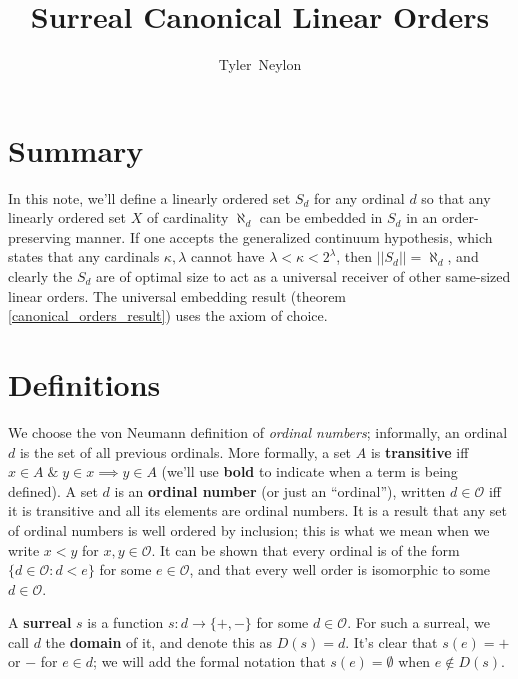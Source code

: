 \documentclass[11pt]{amsart}
\title{Surreal Canonical Linear Orders}
\author{Tyler~Neylon}
\begin{document}
\maketitle

\section{Summary}

In this note, we'll define a linearly ordered set $S_d$ for any ordinal $d$ so that
any linearly ordered set $X$ of cardinality $\aleph_d$ can be embedded in $S_d$
in an order-preserving manner.  If one accepts the generalized continuum hypothesis, which
states that any cardinals $\kappa, \lambda$ cannot have $\lambda < \kappa < 2^\lambda$, then
$||S_d|| = \aleph_d$, and clearly the $S_d$ are of optimal size to act as a universal receiver of
other same-sized linear orders.  The universal embedding result (theorem \ref{canonical_orders_result})
uses the axiom of choice.

\section{Definitions}

We choose the von Neumann definition of {\em ordinal numbers}; informally, an ordinal $d$
is the set of all previous ordinals.  More formally, a set $A$ is {\bf transitive} iff $x\in A \;\&\; y\in x
\implies y\in A$ (we'll use {\bf bold} to indicate when a term is being defined).
A set $d$ is an {\bf ordinal number} (or just an ``ordinal''), written $d\in\mathcal O$
 iff it is transitive and all its elements are ordinal numbers.  It is
a result that any set of ordinal numbers is well ordered by inclusion; this is what we
mean when we write $x < y$ for $x,y\in\mathcal O$.
It can be shown that every ordinal
is of the form $\{d\in\mathcal O: d < e\}$ for some $e\in\mathcal O$, and that every well order
is isomorphic to some $d\in\mathcal O$.

A {\bf surreal} $s$ is a function $s:d\to \{+,-\}$ for some $d\in\mathcal O$.  For such a surreal, we call $d$
the {\bf domain} of it, and denote this as $D(s)=d$.  It's clear that $s(e)=+$ or $-$ for $e\in d$; we will
add the formal notation that $s(e)=\emptyset$ when $e\not\in D(s)$.
\end{document}
